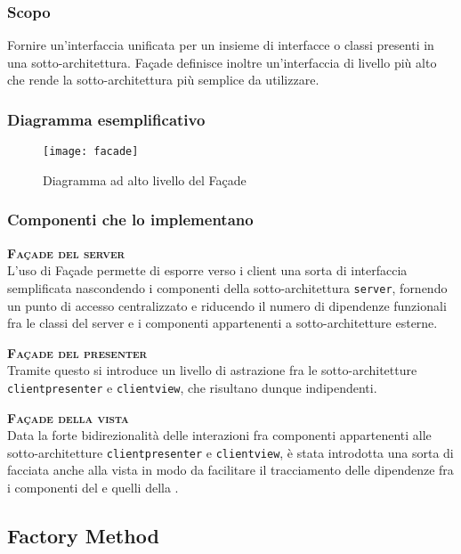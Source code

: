 \subsubsection{Scopo}
Fornire un'interfaccia unificata per un insieme di interfacce o classi presenti in una sotto-architettura. Façade definisce inoltre un'interfaccia di livello più alto che rende la sotto-architettura più semplice da utilizzare.

\subsubsection{Diagramma esemplificativo}
\begin{figure}[H]
\centering
\texttt{[image: facade]}
\caption{Diagramma ad alto livello del  Façade}\label{fig:façade}
\end{figure}

\subsubsection{Componenti che lo implementano}
\begin{description}
  \item{\scshape\bfseries Façade del server}\\
L'uso di Façade permette di esporre verso i client una sorta di interfaccia semplificata nascondendo i componenti della sotto-architettura \texttt{server}, fornendo un punto di accesso centralizzato e riducendo il numero di dipendenze funzionali fra le classi del server e i componenti appartenenti a sotto-architetture esterne.
  \item{\scshape\bfseries Façade del presenter}\\
Tramite questo  si introduce un livello di astrazione fra le sotto-architetture \texttt{clientpresenter} e \texttt{clientview}, che risultano dunque indipendenti.
  \item{\scshape\bfseries Façade della vista}\\
Data la forte bidirezionalità delle interazioni fra componenti appartenenti alle sotto-architetture \texttt{clientpresenter} e \texttt{clientview}, è stata introdotta una sorta di facciata anche alla vista in modo da facilitare il tracciamento delle dipendenze fra i componenti del  e quelli della .
\end{description}

\subsection{Factory Method}


